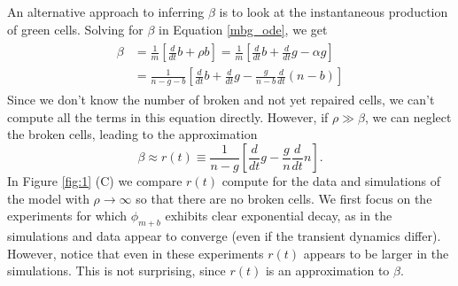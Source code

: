 \documentclass{article}
\begin{document}
An alternative approach to inferring $\beta$ is to look at the instantaneous  production of green cells. Solving for $\beta$ in Equation \ref{mbg_ode}, we get 
\begin{align}
\begin{split}
\beta &= \frac{1}{m}\left[\frac{d}{dt}b +\rho b\right] =  \frac{1}{m}\left[\frac{d}{dt}b +\frac{d}{dt}g - \alpha g\right] \\
&= \frac{1}{n-g-b}\left[\frac{d}{dt}b +\frac{d}{dt}g -\frac{g}{n-b} \frac{d}{dt}(n-b)\right]
\end{split}
\end{align}
Since we don't know the number of broken and not yet repaired cells, we can't compute all the terms in this equation directly. However, if $\rho \gg \beta$, we can neglect the broken cells, leading to the approximation
\begin{equation}\label{rt}
\beta \approx r(t) \equiv \frac{1}{n-g}\left[\frac{d}{dt}g -\frac{g}{n} \frac{d}{dt}n\right]. 
\end{equation}
In Figure \ref{fig:1} (C) we compare $r(t)$ compute for the data and simulations of the model with $\rho \to \infty$ so that there are no broken cells. We first focus on the experiments for which $\phi_{m+b}$ exhibits clear exponential decay, as in the simulations and data appear to converge (even if the transient dynamics differ). However, notice that even in these experiments $r(t)$ appears to be larger in the simulations. 
This is not surprising, since $r(t)$ is an approximation to $\beta$. 
\end{document}
